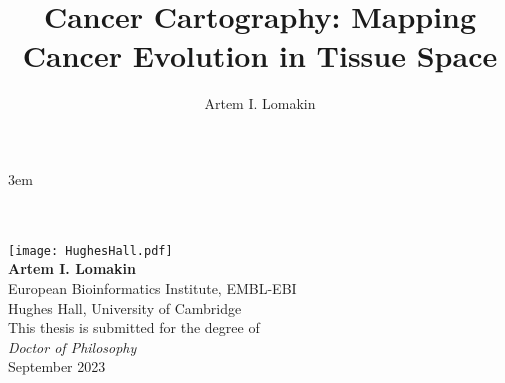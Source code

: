 \documentclass[a4paper,english, twoside, titlepage, DIV=8, BCOR=8.5mm, open=right, chapterprefix=false]{scrbook}
\title{Cancer Cartography: Mapping Cancer Evolution in Tissue Space}
\author{Artem I. Lomakin}
\begin{document}
\emergencystretch 3em %

\begin{titlepage}
    \centering
    \noindent{}\\[0.35cm]
    \noindent{}\\[2cm]
    
    \texttt{[image: HughesHall.pdf]}\\[2cm]

    \textbf{\LARGE Artem I. Lomakin}\\[0.4cm]
    {\Large European Bioinformatics Institute, EMBL-EBI}\\[0.2cm]
    {\Large Hughes Hall, University of Cambridge}\\[1.5cm]
    
    {\Large This thesis is submitted for the degree of}\\[0.2cm]
    \textit{\Large Doctor of Philosophy}\\[2.5cm]
    
    {\Large September 2023}
\end{titlepage}

\frontmatter



\tableofcontents
\listoffigs
\listofabbrev

\mainmatter







\appendix







\listofreferences
\end{document}
